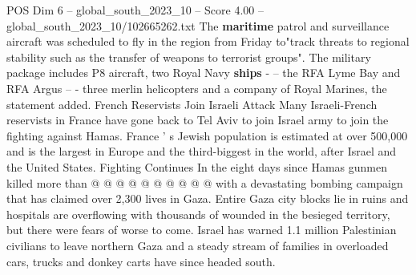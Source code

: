 \begin{textsample}{POS Dim 6 – global\_south\_2023\_10 – Score 4.00 – global\_south\_2023\_10/102665262.txt}
The \textbf{maritime} patrol and surveillance aircraft was scheduled to fly in the region from Friday to"track threats to regional stability such as the transfer of weapons to terrorist groups".
The military package includes P8 aircraft, two Royal Navy \textbf{ships} - -- the RFA Lyme Bay and RFA Argus -- - three merlin helicopters and a company of Royal Marines, the statement added.
French Reservists Join Israeli Attack Many Israeli-French reservists in France have gone back to Tel Aviv to join Israel army to join the fighting against Hamas.
France ' s Jewish population is estimated at over 500,000 and is the largest in Europe and the third-biggest in the world, after Israel and the United States.
Fighting Continues In the eight days since Hamas gunmen killed more than @ @ @ @ @ @ @ @ @ @ with a devastating bombing campaign that has claimed over 2,300 lives in Gaza.
Entire Gaza city blocks lie in ruins and hospitals are overflowing with thousands of wounded in the besieged territory, but there were fears of worse to come.
Israel has warned 1.1 million Palestinian civilians to leave northern Gaza and a steady stream of families in overloaded cars, trucks and donkey carts have since headed south.

\end{textsample}
